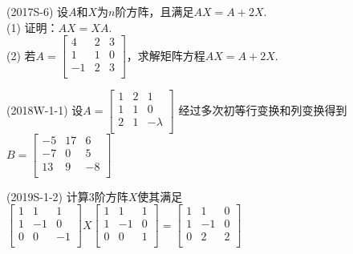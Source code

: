 \documentclass[lang=cn,newtx,10pt,scheme=chinese]{elegantbook}
\begin{document}
\begin{exercise}
    (2017S-6) 设$A$和$X$为$n$阶方阵，且满足$AX = A + 2X$. \\
    (1) 证明：$AX = XA$. \\
    (2) 若$A = 
    \left[
    \begin{matrix}
        4 & 2 & 3 \\
        1 & 1 & 0 \\
        -1 & 2 & 3 \\
    \end{matrix}
    \right]
    $，求解矩阵方程$AX = A + 2X$.
\end{exercise}

\begin{exercise}
    (2018W-1-1) 设$A=
    \left[
    \begin{matrix}
        1 & 2 & 1 \\
        1 & 1 & 0 \\
        2 & 1 & -\lambda \\
    \end{matrix}
    \right]
    $
    经过多次初等行变换和列变换得到$B=
    \left[
    \begin{matrix}
        -5 & 17 & 6 \\
        -7 & 0 & 5 \\
        13 & 9 & -8 \\
    \end{matrix}
    \right]
    $
\end{exercise}

\begin{exercise}
    (2019S-1-2) 计算3阶方阵$X$使其满足$
    \left[
    \begin{matrix}
        1 & 1 & 1 \\
        1 & -1 & 0 \\
        0 & 0 & -1 \\
    \end{matrix}
    \right]
    X
    \left[
    \begin{matrix}
        1 & 1 & 1 \\
        1 & -1 & 0 \\
        0 & 0 & 1 \\
    \end{matrix}
    \right]
    =
    \left[
    \begin{matrix}
        1 & 1 & 0 \\
        1 & -1 & 0 \\
        0 & 2 & 2 \\
    \end{matrix}
    \right]
    $
\end{exercise}
\end{document}
